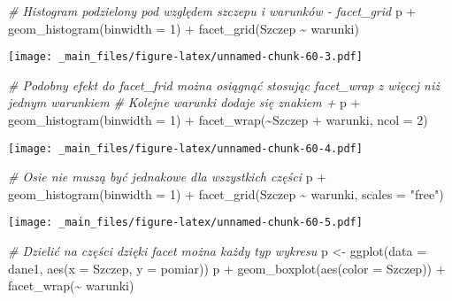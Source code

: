 \documentclass[
]{book}
\newenvironment{Shaded}{\begin{snugshade}}{\end{snugshade}}
\newcommand{\AttributeTok}[1]{\textcolor[rgb]{0.77,0.63,0.00}{#1}}
\newcommand{\CommentTok}[1]{\textcolor[rgb]{0.56,0.35,0.01}{\textit{#1}}}
\newcommand{\DecValTok}[1]{\textcolor[rgb]{0.00,0.00,0.81}{#1}}
\newcommand{\FunctionTok}[1]{\textcolor[rgb]{0.00,0.00,0.00}{#1}}
\newcommand{\NormalTok}[1]{#1}
\newcommand{\OtherTok}[1]{\textcolor[rgb]{0.56,0.35,0.01}{#1}}
\newcommand{\SpecialCharTok}[1]{\textcolor[rgb]{0.00,0.00,0.00}{#1}}
\newcommand{\StringTok}[1]{\textcolor[rgb]{0.31,0.60,0.02}{#1}}
\begin{document}
\begin{Shaded}
\begin{Highlighting}[]
\CommentTok{\# Histogram podzielony pod względem szczepu i warunków {-} facet\_grid}
\NormalTok{p }\SpecialCharTok{+} \FunctionTok{geom\_histogram}\NormalTok{(}\AttributeTok{binwidth =} \DecValTok{1}\NormalTok{) }\SpecialCharTok{+} \FunctionTok{facet\_grid}\NormalTok{(Szczep }\SpecialCharTok{\textasciitilde{}}\NormalTok{ warunki)}
\end{Highlighting}
\end{Shaded}

\texttt{[image: \_main\_files/figure-latex/unnamed-chunk-60-3.pdf]}

\begin{Shaded}
\begin{Highlighting}[]
\CommentTok{\# Podobny efekt do facet\_frid można osiągnąć stosując facet\_wrap z więcej niż jednym warunkiem}
\CommentTok{\# Kolejne warunki dodaje się znakiem +}
\NormalTok{p }\SpecialCharTok{+} \FunctionTok{geom\_histogram}\NormalTok{(}\AttributeTok{binwidth =} \DecValTok{1}\NormalTok{) }\SpecialCharTok{+} \FunctionTok{facet\_wrap}\NormalTok{(}\SpecialCharTok{\textasciitilde{}}\NormalTok{Szczep }\SpecialCharTok{+}\NormalTok{ warunki, }\AttributeTok{ncol =} \DecValTok{2}\NormalTok{)}
\end{Highlighting}
\end{Shaded}

\texttt{[image: \_main\_files/figure-latex/unnamed-chunk-60-4.pdf]}

\begin{Shaded}
\begin{Highlighting}[]
\CommentTok{\# Osie nie muszą być jednakowe dla wszystkich części}
\NormalTok{p }\SpecialCharTok{+} \FunctionTok{geom\_histogram}\NormalTok{(}\AttributeTok{binwidth =} \DecValTok{1}\NormalTok{) }\SpecialCharTok{+} \FunctionTok{facet\_grid}\NormalTok{(Szczep }\SpecialCharTok{\textasciitilde{}}\NormalTok{ warunki, }\AttributeTok{scales =} \StringTok{"free"}\NormalTok{)}
\end{Highlighting}
\end{Shaded}

\texttt{[image: \_main\_files/figure-latex/unnamed-chunk-60-5.pdf]}

\begin{Shaded}
\begin{Highlighting}[]
\CommentTok{\# Dzielić na części dzięki facet można każdy typ wykresu}
\NormalTok{p }\OtherTok{\textless{}{-}} \FunctionTok{ggplot}\NormalTok{(}\AttributeTok{data =}\NormalTok{ dane1, }\FunctionTok{aes}\NormalTok{(}\AttributeTok{x =}\NormalTok{ Szczep, }\AttributeTok{y =}\NormalTok{ pomiar))}
\NormalTok{p }\SpecialCharTok{+} \FunctionTok{geom\_boxplot}\NormalTok{(}\FunctionTok{aes}\NormalTok{(}\AttributeTok{color =}\NormalTok{ Szczep)) }\SpecialCharTok{+} \FunctionTok{facet\_wrap}\NormalTok{(}\SpecialCharTok{\textasciitilde{}}\NormalTok{ warunki)}
\end{Highlighting}
\end{Shaded}
\end{document}
